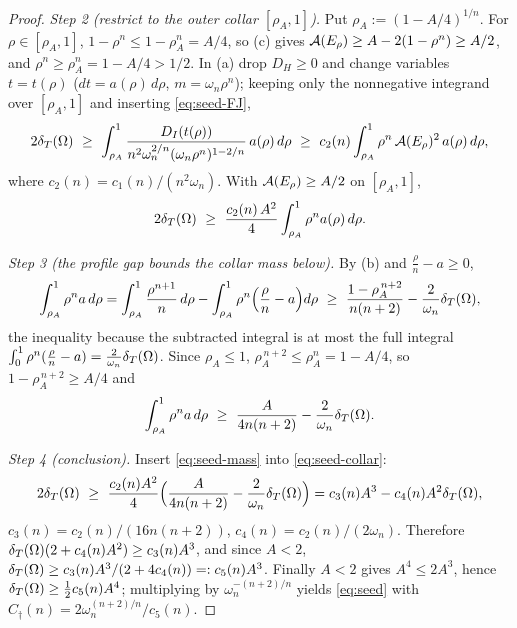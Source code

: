 \begin{proof}
\emph{Step 2 (restrict to the outer collar $[\rho_A,1]$).}
Put $\rho_A:=(1-A/4)^{1/n}$. For $\rho\in[\rho_A,1]$,
$1-\rho^n\le1-\rho_A^n=A/4$, so (c) gives
$\mathcal A(E_\rho)\ge A-2(1-\rho^n)\ge A/2$, and $\rho^n\ge\rho_A^n=1-A/4>1/2$.
In (a) drop $D_H\ge0$ and change variables $t=t(\rho)$
($dt=a(\rho)\,d\rho$, $m=\omega_n\rho^n$); keeping only the nonnegative
integrand over $[\rho_A,1]$ and inserting \eqref{eq:seed-FJ},
\[
   2\dT(\Om)\ \ge\
   \int_{\rho_A}^1\frac{D_I(t(\rho))}{n^2\omega_n^{2/n}(\omega_n\rho^n)^{1-2/n}}\,a(\rho)\,d\rho
   \ \ge\ c_2(n)\int_{\rho_A}^1\rho^n\,\Fr(E_\rho)^2\,a(\rho)\,d\rho,
\]
where $c_2(n)=c_1(n)/(n^2\omega_n)$.
With $\mathcal A(E_\rho)\ge A/2$ on $[\rho_A,1]$,
\begin{equation}\label{eq:seed-collar}
   2\delta_T(\Omega)\ \ge\ \frac{c_2(n)\,A^2}{4}\int_{\rho_A}^1\rho^n a(\rho)\,d\rho .
\end{equation}

\emph{Step 3 (the profile gap bounds the collar mass below).}
By (b) and $\tfrac\rho n-a\ge0$,
\[
   \int_{\rho_A}^1\rho^n a\,d\rho
   =\int_{\rho_A}^1\frac{\rho^{n+1}}{n}\,d\rho
     -\int_{\rho_A}^1\rho^n\Bigl(\frac\rho n-a\Bigr)d\rho
   \ \ge\ \frac{1-\rho_A^{\,n+2}}{n(n+2)}-\frac2{\omega_n}\dT(\Om),
\]
the inequality because the subtracted integral is at most the full integral
$\int_0^1\rho^n(\tfrac\rho n-a)=\tfrac2{\omega_n}\delta_T(\Omega)$. Since $\rho_A\le1$,
$\rho_A^{\,n+2}\le\rho_A^n=1-A/4$, so $1-\rho_A^{\,n+2}\ge A/4$ and
\begin{equation}\label{eq:seed-mass}
   \int_{\rho_A}^1\rho^n a\,d\rho\ \ge\ \frac{A}{4n(n+2)}-\frac2{\omega_n}\dT(\Om).
\end{equation}

\emph{Step 4 (conclusion).} Insert \eqref{eq:seed-mass} into
\eqref{eq:seed-collar}:
\[
   2\delta_T(\Omega)\ \ge\ \frac{c_2(n)A^2}{4}
   \Bigl(\frac{A}{4n(n+2)}-\frac2{\omega_n}\delta_T(\Omega)\Bigr)
   = c_3(n)A^3-c_4(n)A^2\delta_T(\Omega),
\]
$c_3(n)=c_2(n)/(16n(n+2))$, $c_4(n)=c_2(n)/(2\omega_n)$. Therefore
$\delta_T(\Omega)(2+c_4(n)A^2)\ge c_3(n)A^3$, and since $A<2$,
$\delta_T(\Omega)\ge c_3(n)A^3/(2+4c_4(n))=:c_5(n)A^3$. Finally $A<2$ gives
$A^4\le2A^3$, hence $\delta_T(\Omega)\ge\tfrac12 c_5(n)A^4$; multiplying by
$\omega_n^{-(n+2)/n}$ yields \eqref{eq:seed} with
$C_\dagger(n)=2\omega_n^{(n+2)/n}/c_5(n)$.
\end{proof}

